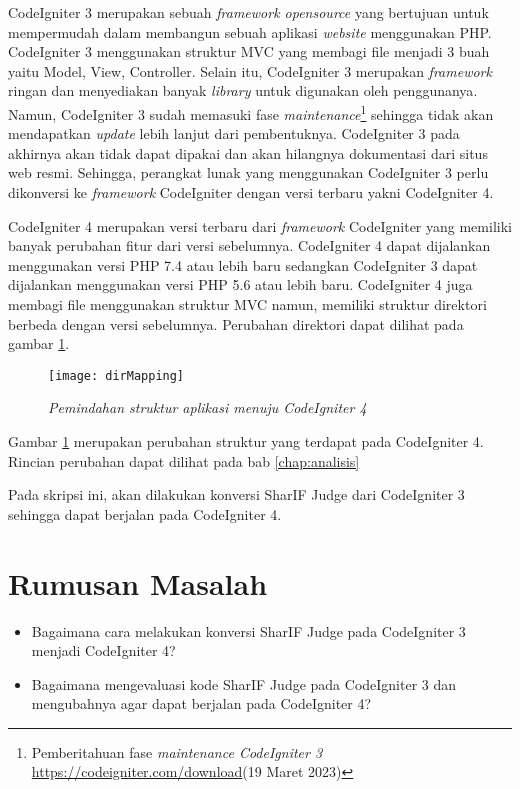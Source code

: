 CodeIgniter 3 merupakan sebuah \textit{framework opensource} yang bertujuan untuk mempermudah dalam membangun sebuah aplikasi \textit{website} menggunakan PHP. CodeIgniter 3 menggunakan struktur MVC yang membagi file menjadi 3 buah yaitu Model, View, Controller. Selain itu, CodeIgniter 3 merupakan \textit{framework} ringan dan menyediakan banyak \textit{library} untuk digunakan oleh penggunanya\cite{ci3:22}. Namun, CodeIgniter 3 sudah memasuki fase \textit{maintenance}\footnote{Pemberitahuan fase \textit{maintenance CodeIgniter 3} \url{https://codeigniter.com/download}(19 Maret 2023)} sehingga tidak akan mendapatkan \textit{update} lebih lanjut dari pembentuknya. CodeIgniter 3 pada akhirnya akan tidak dapat dipakai dan akan hilangnya dokumentasi dari situs web resmi. Sehingga, perangkat lunak yang menggunakan CodeIgniter 3 perlu dikonversi ke \textit{framework} CodeIgniter dengan versi terbaru yakni CodeIgniter 4.

CodeIgniter 4 merupakan versi terbaru dari \textit{framework} CodeIgniter yang memiliki banyak perubahan fitur dari versi sebelumnya. CodeIgniter 4 dapat dijalankan menggunakan versi PHP 7.4 atau lebih baru sedangkan CodeIgniter 3 dapat dijalankan menggunakan versi PHP 5.6 atau lebih baru. CodeIgniter 4 juga membagi file menggunakan struktur MVC namun, memiliki struktur direktori berbeda dengan versi sebelumnya\cite{codeigniter:23:ci4}. Perubahan direktori dapat dilihat pada gambar \ref{fig:dirMappingBab1}.
\begin{figure}[H]
	\centering  
	\texttt{[image: dirMapping]}  
	\caption[\textit{Pemindahan struktur aplikasi menuju \textit{CodeIgniter 4}}]{\textit{Pemindahan struktur aplikasi menuju \textit{CodeIgniter 4}}} 
	\label{fig:dirMappingBab1} 
\end{figure}

Gambar \ref{fig:dirMappingBab1} merupakan perubahan struktur yang terdapat pada CodeIgniter 4. Rincian perubahan dapat dilihat pada bab \ref{chap:analisis}

Pada skripsi ini, akan dilakukan konversi SharIF Judge dari CodeIgniter 3 sehingga dapat berjalan pada CodeIgniter 4.

\section{Rumusan Masalah}
\label{sec:rumusan}
\begin{itemize}
	\item Bagaimana cara melakukan konversi SharIF Judge pada CodeIgniter 3 menjadi CodeIgniter 4?
	\item Bagaimana mengevaluasi kode SharIF Judge pada CodeIgniter 3 dan mengubahnya agar dapat berjalan pada CodeIgniter 4?
\end{itemize}
